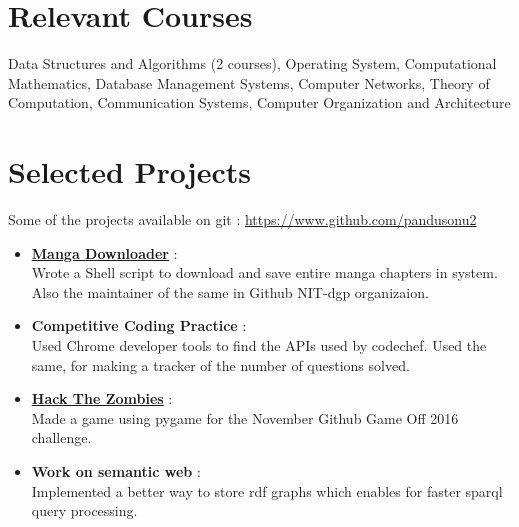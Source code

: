 \documentclass[margin, centered]{res}
\begin{document}
\begin{resume}
\section{Relevant \hspace{2mm} Courses}
Data Structures and Algorithms (2 courses), Operating System, Computational Mathematics, Database Management Systems, Computer Networks, Theory of Computation, Communication Systems, Computer Organization and Architecture

\section{Selected Projects}
Some of the projects available on git : \url{https://www.github.com/pandusonu2}
\begin{itemize}[leftmargin=*]
 \item \textbf{\href{https://github.com/NIT-dgp/manga}{Manga Downloader}} :\\
 Wrote a Shell script to download and save entire manga chapters in system. Also the maintainer of the same in Github NIT-dgp organizaion.
 \item \textbf{Competitive Coding Practice} :\\
 Used Chrome developer tools to find the APIs used by codechef. Used the same, for making a tracker of the number of questions solved.
 \item \textbf{\href{https://github.com/pandusonu2/game-off-2016}{Hack The Zombies}} :\\
 Made a game using pygame for the November Github Game Off 2016 challenge.
 \item \textbf{Work on semantic web} :\\
 Implemented a better way to store rdf graphs which enables for faster sparql query processing.
\end{itemize}



\end{resume}
\end{document}
